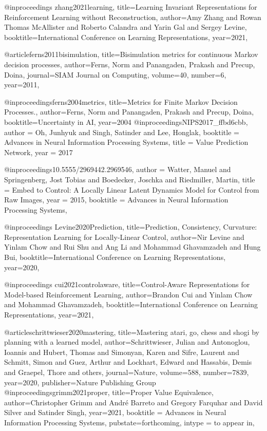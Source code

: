 @inproceedings{
zhang2021learning,
title={Learning Invariant Representations for Reinforcement Learning without Reconstruction},
author={Amy Zhang and Rowan Thomas McAllister and Roberto Calandra and Yarin Gal and Sergey Levine},
booktitle={International Conference on Learning Representations},
year={2021},
}

@article{ferns2011bisimulation,
  title={Bisimulation metrics for continuous Markov decision processes},
  author={Ferns, Norm and Panangaden, Prakash and Precup, Doina},
  journal={SIAM Journal on Computing},
  volume={40},
  number={6},
  year={2011},
}

@inproceedings{ferns2004metrics,
  title={Metrics for Finite Markov Decision Processes.},
  author={Ferns, Norm and Panangaden, Prakash and Precup, Doina},
  booktitle={Uncertainty in AI},
  year={2004}
}
@inproceedings{NIPS2017_ffbd6cbb,
 author = {Oh, Junhyuk and Singh, Satinder and Lee, Honglak},
 booktitle = {Advances in Neural Information Processing Systems},
 title = {Value Prediction Network},
 year = {2017}
}

@inproceedings{10.5555/2969442.2969546,
author = {Watter, Manuel and Springenberg, Jost Tobias and Boedecker, Joschka and Riedmiller, Martin},
title = {Embed to Control: A Locally Linear Latent Dynamics Model for Control from Raw Images},
year = {2015},
booktitle = {Advances in Neural Information Processing Systems},
}

@inproceedings{
Levine2020Prediction,
title={Prediction, Consistency, Curvature: Representation Learning for Locally-Linear Control},
author={Nir Levine and Yinlam Chow and Rui Shu and Ang Li and Mohammad Ghavamzadeh and Hung Bui},
booktitle={International Conference on Learning Representations},
year={2020},
}

@inproceedings{
cui2021controlaware,
title={Control-Aware Representations for Model-based Reinforcement Learning},
author={Brandon Cui and Yinlam Chow and Mohammad Ghavamzadeh},
booktitle={International Conference on Learning Representations},
year={2021},
}

@article{schrittwieser2020mastering,
  title={Mastering atari, go, chess and shogi by planning with a learned model},
  author={Schrittwieser, Julian and Antonoglou, Ioannis and Hubert, Thomas and Simonyan, Karen and Sifre, Laurent and Schmitt, Simon and Guez, Arthur and Lockhart, Edward and Hassabis, Demis and Graepel, Thore and others},
  journal={Nature},
  volume={588},
  number={7839},
  year={2020},
  publisher={Nature Publishing Group}
}
@inproceedings{grimm2021proper,
      title={Proper Value Equivalence}, 
      author={Christopher Grimm and André Barreto and Gregory Farquhar and David Silver and Satinder Singh},
      year={2021},
    booktitle = {Advances in Neural Information Processing Systems},
    pubstate={forthcoming},
    intype = {to appear in},
}


